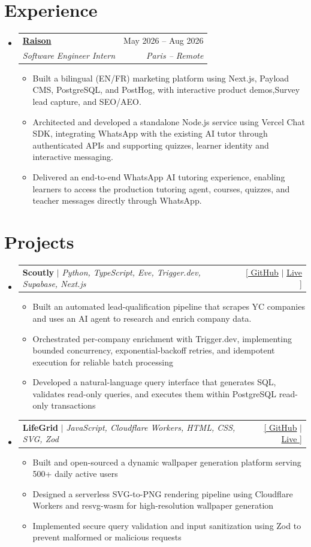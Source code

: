 \documentclass[letterpaper,11pt]{article}
\makeatletter
\newcommand{\resumeItem}[1]{
  \item\small{
    {#1 \vspace{-2pt}}
  }
}
\newcommand{\resumeSubheading}[4]{
  \vspace{-2pt}\item
    \begin{tabular*}{0.97\textwidth}[t]{l@{\extracolsep{\fill}}r}
      \textbf{#1} & #2 \\
      \textit{\small#3} & \textit{\small #4} \\
    \end{tabular*}\vspace{-7pt}
}
\newcommand{\resumeProjectHeading}[2]{
    \item
    \begin{tabular*}{0.97\textwidth}{l@{\extracolsep{\fill}}r}
      \small#1 & #2 \\
    \end{tabular*}\vspace{-7pt}
}
\newcommand{\resumeSubHeadingListStart}{\begin{itemize}[leftmargin=0.15in, label={}]}
\newcommand{\resumeSubHeadingListEnd}{\end{itemize}}
\newcommand{\resumeItemListStart}{\begin{itemize}}
\newcommand{\resumeItemListEnd}{\end{itemize}\vspace{-5pt}}
\makeatother
\begin{document}
\section{Experience}
\resumeSubHeadingListStart

\resumeSubheading
  {\href{https://www.raison.is/}{Raison}}{May 2026 -- Aug 2026} {Software Engineer Intern}{Paris -- Remote}
  \resumeItemListStart
    \resumeItem{Built a bilingual (EN/FR) marketing platform using Next.js, Payload CMS, PostgreSQL, and PostHog, with interactive product demos,Survey lead capture, and SEO/AEO.}
    \resumeItem{Architected and developed a standalone Node.js service using Vercel Chat SDK, integrating WhatsApp with the existing AI tutor through authenticated APIs and supporting quizzes, learner identity and interactive messaging.}
    \resumeItem{Delivered an end-to-end WhatsApp AI tutoring experience, enabling learners to access the production tutoring agent, courses, quizzes, and teacher messages directly through WhatsApp.}
  \resumeItemListEnd


\resumeSubHeadingListEnd


\section{Projects}
    \resumeSubHeadingListStart
    \resumeProjectHeading
{\textbf{Scoutly} $|$ \emph{Python, TypeScript, Eve, Trigger.dev, Supabase, Next.js}}
{\href{https://github.com/aradhyacp/scoutly}{[ GitHub} $|$ \href{https://scoutly-web-fawn.vercel.app/}{Live ]}}
\resumeItemListStart
    \resumeItem{Built an automated lead-qualification pipeline that scrapes YC companies and uses an AI agent to research and
enrich company data.}
    \resumeItem{Orchestrated per-company enrichment with Trigger.dev, implementing bounded concurrency, exponential-backoff retries, and idempotent execution for reliable batch processing}
    \resumeItem{Developed a natural-language query interface that generates SQL, validates read-only queries, and executes them within PostgreSQL read-only transactions}
\resumeItemListEnd

\resumeProjectHeading
{\textbf{LifeGrid} $|$ \emph{JavaScript, Cloudflare Workers, HTML, CSS, SVG, Zod}} 
{\href{https://github.com/aradhyacp/LifeGrid}{[ GitHub} $|$ \href{https://lifegrid-wallpapers.pages.dev/}{Live ]}}
\resumeItemListStart
    \resumeItem{Built and open-sourced a dynamic wallpaper generation platform serving 500+ daily active users}
    \resumeItem{Designed a serverless SVG-to-PNG rendering pipeline using Cloudflare Workers and resvg-wasm for high-resolution wallpaper generation}
    \resumeItem{Implemented secure query validation and input sanitization using Zod to prevent malformed or malicious requests}
\resumeItemListEnd
    \resumeSubHeadingListEnd
\end{document}
